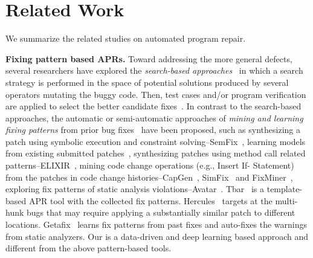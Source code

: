 \section{Related Work}
We summarize the related studies on automated program repair.

{\bf Fixing pattern based APRs.} 
%
Toward addressing the more general
defects, several researchers have explored the {\em search-based
	approaches}~\cite{le2011genprog,qi2014strength,LeGoues-icse12,martinez2016astor}
in which a search strategy is performed in the space of potential
solutions produced by several operators mutating the buggy
code. Then, test cases and/or program verification are applied to
select the better candidate fixes~\cite{smith2015cure}. 
%
In contrast to the search-based approaches, 
the automatic or semi-automatic approaches of {\em mining and learning fixing patterns} from prior bug
fixes~\cite{le2016history, kim2013automatic,nguyen2013semfix,liu2019avatar,tbar-issta19} have been proposed, such as synthesizing a patch using symbolic execution and
constraint solving--SemFix~\cite{nguyen2013semfix},  
learning models from existing submitted patches~\cite{long2016automatic,long2017automatic,le2016history}, synthesizing
patches using method call related patterns--ELIXIR~\cite{saha2017elixir}, mining code change operations (e.g., Insert If- Statement) from the patches in code change histories--CapGen~\cite{wen2018context}, SimFix~\cite{jiang2018shaping} and
FixMiner~\cite{koyuncu2018fixminer}, exploring fix patterns of static analysis violations--Avatar~\cite{liu2019avatar}. Tbar~\cite{tbar-issta19} is a template-based APR tool with the collected fix patterns.
Hercules~\cite{saha2019harnessing} targets at the multi-hunk bugs that may require applying a substantially similar patch to different locations. 
Getafix~\cite{bader2019getafix} learns fix patterns from past fixes and auto-fixes the warnings from static analyzers. 
Our {\tool} is a data-driven and deep learning based approach and different from the above pattern-based tools. 




